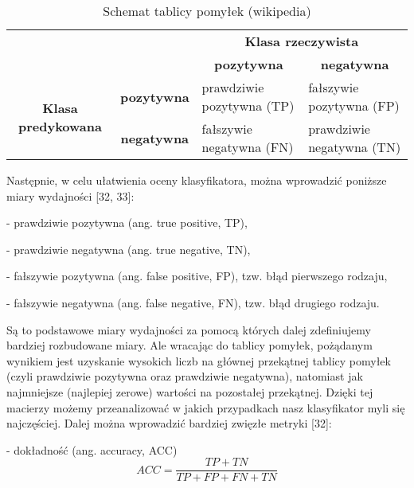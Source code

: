 \begin{table}[h]
	\centering
	
	\begin{threeparttable}
		\caption{Schemat tablicy pomyłek (wikipedia)}
		\label{tab:tab2}
				
		\begin{tabularx}{1\textwidth}{ |c|c|X|X| }\hline
		  \multicolumn{2}{|c|}{\multirow{2}{*}{}} & \multicolumn{2}{|c|}{\textbf{Klasa rzeczywista}}\\ \cline{3-4}
      
		  \multicolumn{2}{|c|}{} & \multicolumn{1}{|c|}{\textbf{pozytywna}} & \multicolumn{1}{c|}{\textbf{negatywna}}\\ \hline
       
		  \multirow{2}{*}{\textbf{Klasa predykowana}} & \textbf{pozytywna} & prawdziwie pozytywna (TP) & fałszywie pozytywna (FP)\\ \cline{2-4}
      
		   & \textbf{negatywna} & fałszywie negatywna (FN) & prawdziwie negatywna (TN)\\ \hline
		\end{tabularx}

	\end{threeparttable}
\end{table}

Następnie, w celu ułatwienia oceny klasyfikatora, można wprowadzić poniższe miary wydajności [32, 33]:

- prawdziwie pozytywna (ang. true positive, TP),

- prawdziwie negatywna (ang. true negative, TN),

- fałszywie pozytywna (ang. false positive, FP), tzw. błąd pierwszego rodzaju,

- fałszywie negatywna (ang. false negative, FN), tzw. błąd drugiego rodzaju.

\noindent Są to podstawowe miary wydajności za pomocą których dalej zdefiniujemy bardziej rozbudowane miary. Ale wracając do tablicy pomyłek, pożądanym wynikiem jest uzyskanie wysokich liczb na głównej przekątnej tablicy pomyłek (czyli prawdziwie pozytywna oraz prawdziwie negatywna), natomiast jak najmniejsze (najlepiej zerowe) wartości na pozostałej przekątnej. Dzięki tej macierzy możemy przeanalizować w jakich przypadkach nasz klasyfikator myli się najczęściej. Dalej można wprowadzić bardziej zwięzłe metryki [32]:

- dokładność (ang. accuracy, ACC)
\begin{equation}
ACC=\frac {TP+TN} {TP+FP+FN+TN}
\end{equation}

